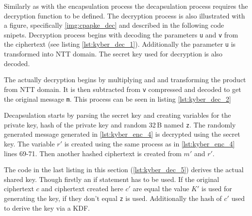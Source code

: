 Similarly as with the encapsulation process the decapsulation process requires the decryption function to be defined. The decryption process is also illustrated with a figure, specifically \ref{img:cpapke_dec} and described in the following code snipets. Decryption process begins with decoding the parameters \texttt{u} and \texttt{v} from the ciphertext (see listing \ref{lst:kyber_dec_1}). Additionally the parameter \texttt{u} is transformed into NTT domain. The secret key used for decryption is also decoded.

The actually decryption begins by multiplying  and  and transforming the product from NTT domain. It is then subtracted from \texttt{v} compressed and decoded to get the original message \texttt{m}. This process can be seen in listing \ref{lst:kyber_dec_2}


Decapsulation starts by parsing the secret key and creating variables for the private key, hash of the private key and random 32\,B named \texttt{z}. The randomly generated message generated in \ref{lst:kyber_enc_4} is decrypted using the secret key. The variable $r'$ is created using the same process as in \ref{lst:kyber_enc_4} lines 69-71. Then another hashed ciphertext is created from $m'$ and $r'$.

The code in the last listing in this section (\ref{lst:kyber_dec_5}) derives the actual shared key. Though firstly an if statement has to be used. If the original ciphertext $c$ and ciphertext created here $c'$ are equal the value $K'$ is used for generating the key, if they don't equal \texttt{z} is used. Additionally the hash of $c'$ used to derive the key via a KDF.
